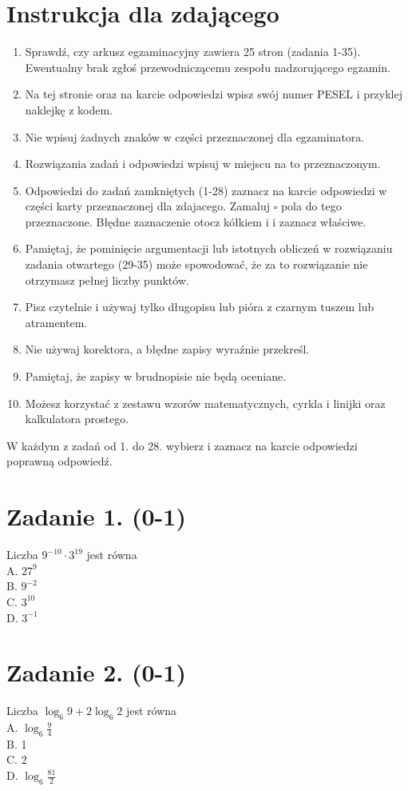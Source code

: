\documentclass[10pt]{article}
\begin{document}
\section*{Instrukcja dla zdającego}
\begin{enumerate}
  \item Sprawdź, czy arkusz egzaminacyjny zawiera 25 stron (zadania 1-35). Ewentualny brak zgłoś przewodniczącemu zespołu nadzorującego egzamin.
  \item Na tej stronie oraz na karcie odpowiedzi wpisz swój numer PESEL i przyklej naklejkę z kodem.
  \item Nie wpisuj żadnych znaków w części przeznaczonej dla egzaminatora.
  \item Rozwiązania zadań i odpowiedzi wpisuj w miejscu na to przeznaczonym.
  \item Odpowiedzi do zadań zamkniętych (1-28) zaznacz na karcie odpowiedzi w części karty przeznaczonej dla zdajacego. Zamaluj \(\square\) pola do tego przeznaczone. Błędne zaznaczenie otocz kółkiem i i zaznacz właściwe.
  \item Pamiętaj, że pominięcie argumentacji lub istotnych obliczeń w rozwiązaniu zadania otwartego (29-35) może spowodować, że za to rozwiązanie nie otrzymasz pełnej liczby punktów.
  \item Pisz czytelnie i używaj tylko długopisu lub pióra z czarnym tuszem lub atramentem.
  \item Nie używaj korektora, a błędne zapisy wyraźnie przekreśl.
  \item Pamiętaj, że zapisy w brudnopisie nie będą oceniane.
  \item Możesz korzystać z zestawu wzorów matematycznych, cyrkla i linijki oraz kalkulatora prostego.
\end{enumerate}

W każdym z zadań od 1. do 28. wybierz i zaznacz na karcie odpowiedzi poprawną odpowiedź.

\section*{Zadanie 1. (0-1)}
Liczba \(9^{-10} \cdot 3^{19}\) jest równa\\
A. \(27^{9}\)\\
B. \(9^{-2}\)\\
C. \(3^{10}\)\\
D. \(3^{-1}\)

\section*{Zadanie 2. (0-1)}
Liczba \(\log _{6} 9+2 \log _{6} 2\) jest równa\\
A. \(\log _{6} \frac{9}{4}\)\\
B. 1\\
C. 2\\
D. \(\log _{6} \frac{81}{2}\)
\end{document}
